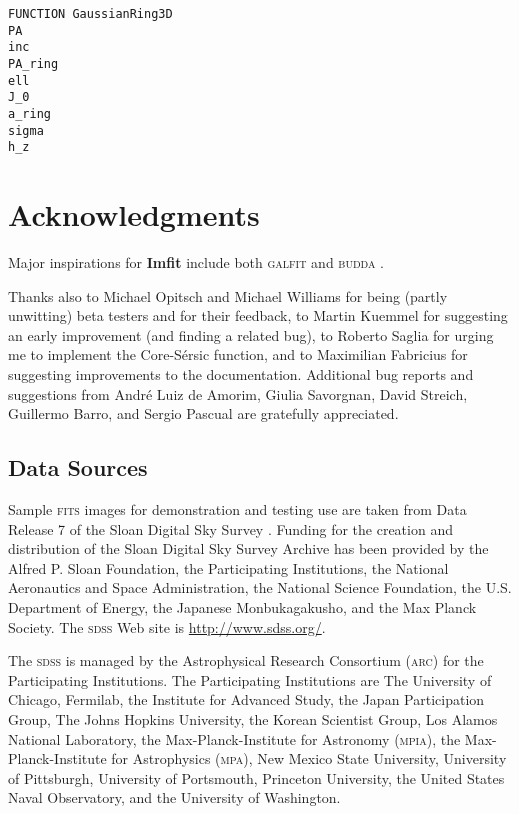 \documentclass[10pt,a4paper,article]{memoir}
\newcommand{\Imfit}{\textbf{Imfit}}
\begin{document}
\begin{verbatim}
FUNCTION GaussianRing3D
PA
inc
PA_ring
ell
J_0
a_ring
sigma
h_z
\end{verbatim}





\chapter{Acknowledgments}

Major inspirations for \Imfit{} include both \textsc{galfit} \citep{peng02,peng10} and 
\textsc{budda} \citep{desouza04,gadotti08}.

Thanks also to Michael Opitsch and Michael Williams for being (partly
unwitting) beta testers and for their feedback, to Martin Kuemmel for
suggesting an early improvement (and finding a related bug), to Roberto Saglia
for urging me to implement the Core-S{\'e}rsic function, and to
Maximilian Fabricius for suggesting improvements to the documentation.
Additional bug reports and suggestions from Andr{\'e} Luiz de Amorim,
Giulia Savorgnan, David Streich, Guillermo Barro, and Sergio Pascual are gratefully
appreciated.


\section{Data Sources}

Sample \textsc{fits} images for demonstration and testing use are taken from Data Release
7 \citep{abazajian09} of the Sloan Digital Sky Survey \citep{york00}. Funding
for the creation and distribution of the Sloan Digital Sky Survey Archive has been provided by the
Alfred P. Sloan Foundation, the Participating Institutions, the National
Aeronautics and Space Administration, the National Science Foundation, the U.S.
Department of Energy, the Japanese Monbukagakusho, and the Max Planck Society. 
The \textsc{sdss} Web site is \url{http://www.sdss.org/}.

The \textsc{sdss} is managed by the Astrophysical Research Consortium (\textsc{arc}) for
the Participating Institutions.  The Participating Institutions are
The University of Chicago, Fermilab, the Institute for Advanced Study,
the Japan Participation Group, The Johns Hopkins University, the
Korean Scientist Group, Los Alamos National Laboratory, the
Max-Planck-Institute for Astronomy (\textsc{mpia}), the Max-Planck-Institute
for Astrophysics (\textsc{mpa}), New Mexico State University, University of
Pittsburgh, University of Portsmouth, Princeton University, the United
States Naval Observatory, and the University of Washington.
\end{document}
